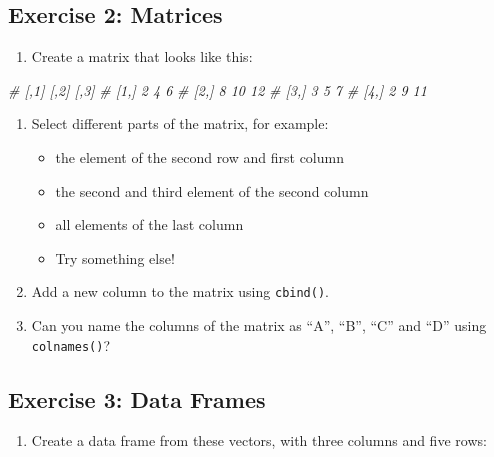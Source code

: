 \documentclass[
]{book}
\newenvironment{Shaded}{\begin{snugshade}}{\end{snugshade}}
\newcommand{\CommentTok}[1]{\textcolor[rgb]{0.56,0.35,0.01}{\textit{#1}}}
\providecommand{\tightlist}{%
  \setlength{\itemsep}{0pt}\setlength{\parskip}{0pt}}
\begin{document}
\hypertarget{exercise-2-matrices}{%
\subsection*{Exercise 2: Matrices}\label{exercise-2-matrices}}

\begin{enumerate}
\def\labelenumi{\arabic{enumi}.}
\tightlist
\item
  Create a matrix that looks like this:
\end{enumerate}

\begin{Shaded}
\begin{Highlighting}[]
\CommentTok{\#      [,1] [,2] [,3]}
\CommentTok{\# [1,]    2    4    6}
\CommentTok{\# [2,]    8    10   12}
\CommentTok{\# [3,]    3    5    7}
\CommentTok{\# [4,]    2    9    11}
\end{Highlighting}
\end{Shaded}

\begin{enumerate}
\def\labelenumi{\arabic{enumi}.}
\setcounter{enumi}{1}
\item
  Select different parts of the matrix, for example:

  \begin{itemize}
  \tightlist
  \item
    the element of the second row and first column
  \item
    the second and third element of the second column
  \item
    all elements of the last column
  \item
    Try something else!
  \end{itemize}
\item
  Add a new column to the matrix using \texttt{cbind()}.
\item
  Can you name the columns of the matrix as ``A'', ``B'', ``C'' and ``D'' using \texttt{colnames()}?
\end{enumerate}

\hypertarget{exercise-3-data-frames}{%
\subsection*{Exercise 3: Data Frames}\label{exercise-3-data-frames}}

\begin{enumerate}
\def\labelenumi{\arabic{enumi}.}
\tightlist
\item
  Create a data frame from these vectors, with three columns and five rows:
\end{enumerate}
\end{document}
